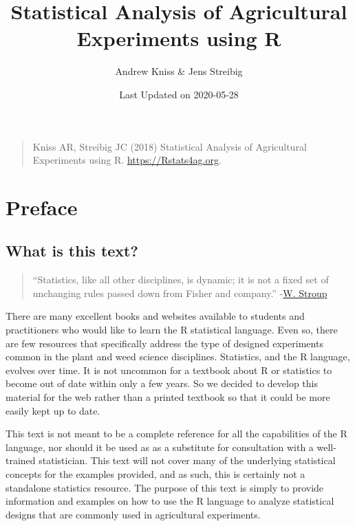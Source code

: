 \documentclass[letterpaper,]{book}
\title{Statistical Analysis of Agricultural Experiments using R}
\author{Andrew Kniss \& Jens Streibig}
\date{Last Updated on 2020-05-28}
\begin{document}
\maketitle

{
\setcounter{tocdepth}{1}
\tableofcontents
}
\hypertarget{section}{%
\chapter*{}\label{section}}

\begin{quote}
Kniss AR, Streibig JC (2018) Statistical Analysis of Agricultural Experiments using R. \url{https://Rstats4ag.org}.
\end{quote}

\hypertarget{preface}{%
\chapter*{Preface}\label{preface}}

\hypertarget{what-is-this-text}{%
\section*{What is this text?}\label{what-is-this-text}}

\begin{quote}
``Statistics, like all other disciplines, is dynamic; it is not a fixed set of unchanging rules passed down from Fisher and company.'' -\href{https://dl.sciencesocieties.org/publications/aj/articles/107/2/811}{W. Stroup}
\end{quote}

There are many excellent books and websites available to students and practitioners who would like to learn the R statistical language. Even so, there are few resources that specifically address the type of designed experiments common in the plant and weed science disciplines. Statistics, and the R language, evolves over time. It is not uncommon for a textbook about R or statistics to become out of date within only a few years. So we decided to develop this material for the web rather than a printed textbook so that it could be more easily kept up to date.

This text is not meant to be a complete reference for all the capabilities of the R language, nor should it be used as as a substitute for consultation with a well-trained statistician. This text will not cover many of the underlying statistical concepts for the examples provided, and as such, this is certainly not a standalone statistics resource. The purpose of this text is simply to provide information and examples on how to use the R language to analyze statistical designs that are commonly used in agricultural experiments.
\end{document}
